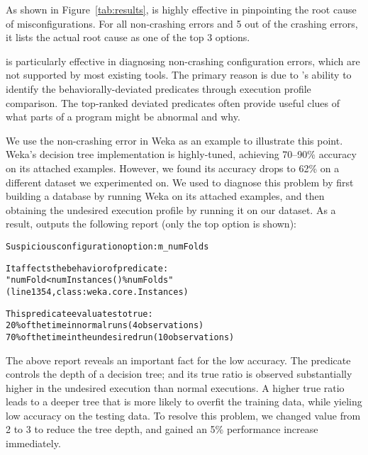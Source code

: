

As shown in Figure~\ref{tab:results},
\ourtool is highly effective in pinpointing the root cause of
misconfigurations. For all \noncrash non-crashing errors
and 5 out of the \crash crashing errors, it lists the actual root cause as one of the top 3 options. 


\ourtool is particularly effective in diagnosing non-crashing configuration errors,
which are not supported by most existing tools. The primary reason is due to
\ourtool's ability to identify the behaviorally-deviated predicates through
execution profile comparison. The top-ranked deviated predicates often provide
useful clues of what parts of a program might be abnormal and why.

We use the non-crashing error in Weka as an example to illustrate
this point. 
Weka's decision tree implementation is highly-tuned, achieving 70--90\% accuracy on
its attached examples. However, we found its accuracy drops to 62\%
on a different dataset we experimented on. We used \ourtool to diagnose this
problem by first building a database by running Weka on its attached examples, and
then
obtaining the undesired execution profile by running it on our dataset. As a result,
\ourtool outputs the following report (only the top option is shown):


\begin{CodeOut}
\begin{alltt} 
Suspicious configuration option: m\_numFolds

It affects the behavior of predicate:
"numFold < numInstances() \% numFolds"
(line 1354, class: weka.core.Instances) 

This predicate evaluates to true:
  20\% of the time in normal runs (4 observations)
  70\% of the time in the undesired run (10 observations)

\end{alltt}
\end{CodeOut}

\vspace{-3mm}

The above report reveals an important fact for the low accuracy.
The predicate  controls
the depth of a decision tree; and its
true ratio is observed substantially higher in the undesired execution
than normal executions. A higher true ratio leads
to a deeper tree that is more likely to overfit the training
data, while yieling low accuracy on the testing data.
To resolve this problem, we changed 
value from 2 to 3 to reduce the tree depth, and
gained an 5\% performance increase immediately.

